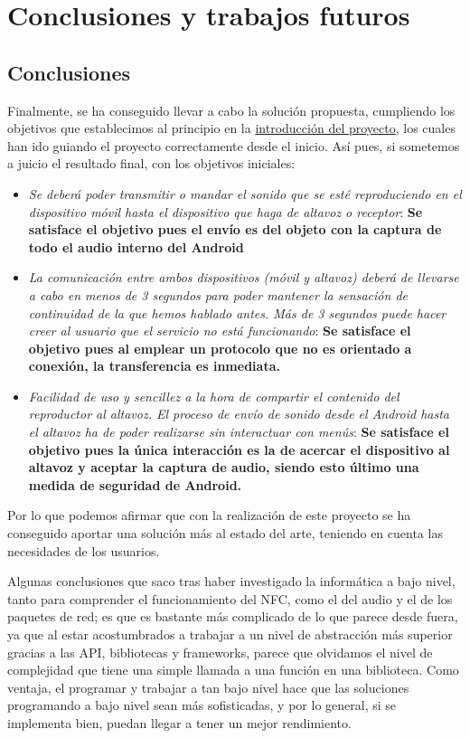 \chapter{Conclusiones y trabajos futuros}

\section{Conclusiones}

Finalmente, se ha conseguido llevar a cabo la solución propuesta, cumpliendo los
objetivos que establecimos al principio en la
\hyperref[introduccion]{introducción del proyecto}, los cuales han ido guiando
el proyecto correctamente desde el inicio. Así pues, si sometemos a juicio el
resultado final, con los objetivos iniciales:

\begin{itemize}
    \item \textit{Se deberá poder transmitir o mandar el sonido que se esté
    reproduciendo en el dispositivo móvil hasta el dispositivo que haga de
    altavoz o receptor}: \textbf{Se satisface el objetivo pues el envío es del
    objeto con la captura de todo el audio interno del Android}
    \item \textit{La comunicación entre ambos dispositivos (móvil y altavoz)
    deberá de llevarse a cabo en menos de 3 segundos para poder mantener la
    sensación de continuidad de la que hemos hablado antes. Más de 3 segundos
    puede hacer creer al usuario que el servicio no está funcionando}: \textbf{Se
    satisface el objetivo pues al emplear un protocolo que no es orientado a
    conexión, la transferencia es inmediata.}
    \item \textit{Facilidad de uso y sencillez a la hora de compartir el
    contenido del reproductor al altavoz. El proceso de envío de sonido desde el
    Android hasta el altavoz ha de poder realizarse sin interactuar con menús}:
    \textbf{Se satisface el objetivo pues la única interacción es la de acercar
    el dispositivo al altavoz y aceptar la captura de audio, siendo esto último
    una medida de seguridad de Android.}
\end{itemize}

Por lo que podemos afirmar que con la realización de este proyecto se ha
conseguido aportar una solución más al estado del arte, teniendo en cuenta las
necesidades de los usuarios. 

Algunas conclusiones que saco tras haber investigado la informática a bajo
nivel, tanto para comprender el funcionamiento del NFC, como el del audio y el
de los paquetes de red; es que es bastante más complicado de lo que parece desde
fuera, ya que al estar acostumbrados a trabajar a un nivel de abstracción más
superior gracias a las API, bibliotecas y frameworks, parece que olvidamos el
nivel de complejidad que tiene una simple llamada a una función en una
biblioteca. Como ventaja, el programar y trabajar a tan bajo nivel hace que las
soluciones programando a bajo nivel sean más sofisticadas, y por lo general, si
se implementa bien, puedan llegar a tener un mejor rendimiento.

